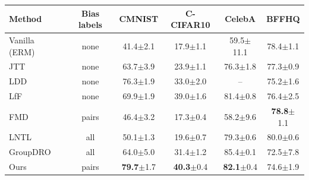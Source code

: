 \begin{tabular}{lccccc}
\toprule
Method & Bias labels & CMNIST & C-CIFAR10 & CelebA & BFFHQ \\
\midrule
Vanilla (ERM) & none & 41.4{\scriptsize$\pm$2.1} & 17.9{\scriptsize$\pm$1.1} & 59.5{\scriptsize$\pm$11.1} & 78.4{\scriptsize$\pm$1.1} \\
JTT~\cite{liu2021jtt} & none & 63.7{\scriptsize$\pm$3.9} & 23.9{\scriptsize$\pm$1.1} & 76.3{\scriptsize$\pm$1.8} & 77.3{\scriptsize$\pm$0.9} \\
LDD~\cite{lee2021ldd} & none & 76.3{\scriptsize$\pm$1.9} & 33.0{\scriptsize$\pm$2.0} & – & 75.2{\scriptsize$\pm$1.6} \\
LfF~\cite{nam2020lff} & none & 69.9{\scriptsize$\pm$1.9} & 39.0{\scriptsize$\pm$1.6} & 81.4{\scriptsize$\pm$0.8} & 76.4{\scriptsize$\pm$2.5} \\
FMD~\cite{chen2023fmd} & pairs & 46.4{\scriptsize$\pm$3.2} & 17.3{\scriptsize$\pm$0.4} & 58.2{\scriptsize$\pm$9.6} & \textbf{78.8}{\scriptsize$\pm$1.1} \\
LNTL~\cite{kim2019lntl} & all & 50.1{\scriptsize$\pm$1.3} & 19.6{\scriptsize$\pm$0.7} & 79.3{\scriptsize$\pm$0.6} & 80.0{\scriptsize$\pm$0.6} \\
GroupDRO~\cite{sagawa2020groupdro} & all & 64.0{\scriptsize$\pm$5.0} & 31.4{\scriptsize$\pm$1.2} & 85.4{\scriptsize$\pm$0.1} & 72.5{\scriptsize$\pm$7.8} \\
Ours & pairs & \textbf{79.7}{\scriptsize$\pm$1.7} & \textbf{40.3}{\scriptsize$\pm$0.4} & \textbf{82.1}{\scriptsize$\pm$0.4} & 74.6{\scriptsize$\pm$1.9} \\
\bottomrule
\end{tabular}
